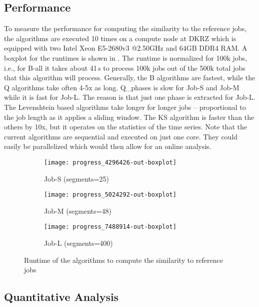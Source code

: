 \documentclass{jhps}
\begin{document}
\subsection{Performance}

To measure the performance for computing the similarity to the reference jobs, the algorithms are executed 10 times on a compute node at DKRZ which is equipped with two Intel Xeon E5-2680v3 @2.50GHz and 64GB DDR4 RAM.
A boxplot for the runtimes is shown in .
The runtime is normalized for 100k jobs, i.e., for B-all it takes about 41\,s to process 100k jobs out of the 500k total jobs that this algorithm will process.
Generally, the B algorithms are fastest, while the Q algorithms take often 4-5x as long.
Q\_phases is slow for Job-S and Job-M while it is fast for Job-L. 
The reason is that just one phase is extracted for Job-L.
The Levenshtein based algorithms take longer for longer jobs -- proportional to the job length as it applies a sliding window.
The KS algorithm is faster than the others by 10x, but it operates on the statistics of the time series.
Note that the current algorithms are sequential and executed on just one core.
They could easily be parallelized which would then allow for an online analysis.

\begin{figure}
\centering
  \begin{subfigure}{0.48\textwidth}
  \centering
  \texttt{[image: progress\_4296426-out-boxplot]}
  \caption{Job-S (segments=25)}\label{fig:perf-job-S}
  \end{subfigure}
  \begin{subfigure}{0.48\textwidth}
  \centering
  \texttt{[image: progress\_5024292-out-boxplot]}
  \caption{Job-M (segments=48)}\label{fig:perf-job-M}
  \end{subfigure}
  \begin{subfigure}{0.48\textwidth}
  \centering
  \texttt{[image: progress\_7488914-out-boxplot]}
  \caption{Job-L (segments=400)}\label{fig:perf-job-L}
  \end{subfigure}

  \caption{Runtime of the algorithms to compute the similarity to reference jobs}%
  \label{fig:performance}
\end{figure}


\subsection{Quantitative Analysis}
\end{document}
